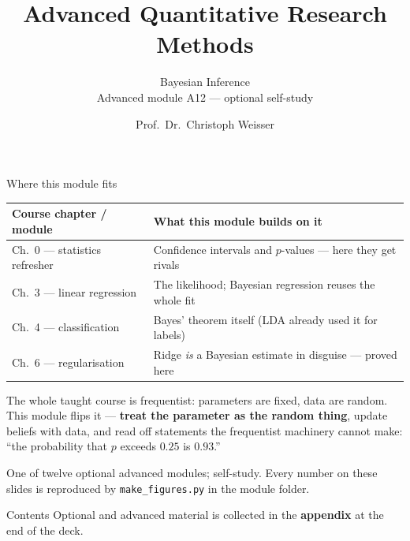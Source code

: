 \documentclass[aspectratio=169,11pt]{beamer}
\title{Advanced Quantitative Research Methods}
\subtitle{Bayesian Inference\\[2pt]{\small Advanced module A12 --- optional self-study}}
\author{Prof.\ Dr.\ Christoph Weisser}
\date{}\graphicspath{{images/}}
\begin{document}
\begin{frame}[plain]\titlepage\end{frame}

\begin{frame}{Where this module fits}
  \footnotesize
  \begin{center}
  \begin{tabular}{@{}p{3.9cm}p{8.4cm}@{}}
    \toprule
    \textbf{Course chapter / module} & \textbf{What this module builds on it} \\
    \midrule
    Ch.\ 0 --- statistics refresher & Confidence intervals and $p$-values --- here they get rivals \\
    Ch.\ 3 --- linear regression & The likelihood; Bayesian regression reuses the whole fit \\
    Ch.\ 4 --- classification & Bayes' theorem itself (LDA already used it for labels) \\
    Ch.\ 6 --- regularisation & Ridge \emph{is} a Bayesian estimate in disguise --- proved here \\
    \bottomrule
  \end{tabular}
  \end{center}
  \vspace{2pt}
  \begin{takeaway}
    The whole taught course is frequentist: parameters are fixed, data are random.
    This module flips it --- \textbf{treat the parameter as the random thing},
    update beliefs with data, and read off statements the frequentist machinery
    cannot make: ``the probability that $p$ exceeds $0.25$ is $0.93$.''
  \end{takeaway}
  {\scriptsize One of twelve optional advanced modules; self-study. Every number on
  these slides is reproduced by \texttt{make\_figures.py} in the module folder.}
\end{frame}

\begin{frame}{Contents}\small\tableofcontents[hideallsubsections]
  \vfill
  {\tiny Optional and advanced material is collected in the \textbf{appendix} at the end of the deck.}
\end{frame}
\end{document}
